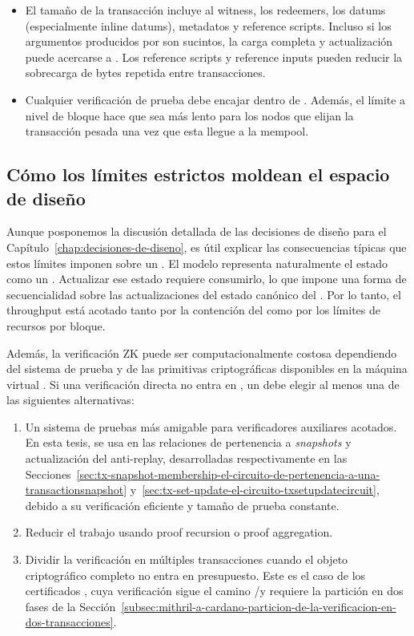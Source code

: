 \begin{itemize}[noitemsep]
	\item El tamaño de la transacción incluye al witness, los redeemers, los datums (especialmente inline datums), metadatos y reference scripts. Incluso si los argumentos producidos por \Groth son sucintos, la carga completa y actualización puede acercarse a \maxTxSize. Los reference scripts y reference inputs pueden reducir la sobrecarga de bytes repetida entre transacciones.
	\item Cualquier verificación de prueba \Onchain debe encajar dentro de \maxTxExUnits. Además, el límite a nivel de bloque \maxBlockExUnits hace que sea más lento para los nodos que elijan la transacción pesada una vez que esta llegue a la mempool.
\end{itemize}

\subsection{Cómo los límites estrictos moldean el espacio de diseño}
\label{subsec:motivation-como-los-limites-estrictos-moldean-el-espacio-de-diseno}

Aunque posponemos la discusión detallada de las decisiones de diseño para el Capítulo~\ref{chap:decisiones-de-diseno}, es útil explicar las consecuencias típicas que estos límites imponen sobre un \zkBridge. El modelo \eUTxO representa naturalmente el estado como un \UTxO. Actualizar ese estado requiere consumirlo, lo que impone una forma de secuencialidad sobre las actualizaciones del estado canónico del \Bridge. Por lo tanto, el throughput está acotado tanto por la contención del \UTxO como por los límites de recursos por bloque.

Además, la verificación ZK puede ser computacionalmente costosa dependiendo del sistema de prueba y de las primitivas criptográficas disponibles en la máquina virtual \Onchain. Si una verificación directa no entra en \maxTxExUnits, un \Bridge debe elegir al menos una de las siguientes alternativas:

\begin{enumerate}[noitemsep]
		\item Un sistema de pruebas más amigable para verificadores auxiliares acotados. En esta tesis, \Groth se usa en las relaciones de pertenencia a \textit{snapshots} y actualización del \SMT anti-replay, desarrolladas respectivamente en las Secciones~\ref{sec:tx-snapshot-membership-el-circuito-de-pertenencia-a-una-transactionsnapshot} y~\ref{sec:tx-set-update-el-circuito-txsetupdatecircuit}, debido a su verificación eficiente y tamaño de prueba constante.
		\item Reducir el trabajo \Onchain usando proof recursion o proof aggregation.
		\item Dividir la verificación en múltiples transacciones cuando el objeto criptográfico completo no entra en presupuesto. Este es el caso de los certificados \Mithril, cuya verificación \STM sigue el camino \HaloTwo/\Midnight y requiere la partición en dos fases de la Sección~\ref{subsec:mithril-a-cardano-particion-de-la-verificacion-en-dos-transacciones}.
\end{enumerate}

